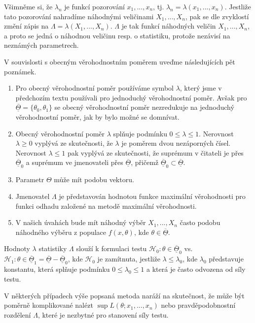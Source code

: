 Všimněme si, že $\lambda_n$ je funkcí pozorování $x_1, ..., x_n$, tj. $\lambda_n = \lambda(x_1, ..., x_n)$. Jestliže tato pozorování nahradíme náhodnými veličinami $X_1, ..., X_n$, pak se dle zvyklostí změní zápis na $\Lambda = \lambda(X_1, ..., X_n)$. $\Lambda$ je tak funkcí náhodných veličin $X_1, ..., X_n$, a proto se jedná o náhodnou veličinu resp. o statistiku, protože nezávisí na neznámých parametrech.

V souvislosti s obecným věrohodnostním poměrem uveďme následujících pět poznámek.
\begin{enumerate}
\item Pro obecný věrohodnostní poměr používáme symbol $\lambda$, který jsme v předchozím textu používali pro jednoduchý věrohodnostní poměr. Avšak pro $\overline{\underline{\Theta}} = \{\theta_0, \theta_1\}$ se obecný věrohodnostní poměr nezredukuje na jednoduchý věrohodnostní poměr, jak by bylo možné se domnívat.
\item Obecný věrohodnostní poměr $\lambda$ splňuje podmínku $0 \le \lambda \le 1$. Nerovnost $\lambda \ge 0$ vyplývá ze skutečnosti, že $\lambda$ je poměrem dvou nezáporných čísel. Nerovnost $\lambda \le 1$ pak vyplývá ze skutečnosti, že suprémum v čitateli je přes $\overline{\underline{\Theta}}_0$ a suprémum ve jmenovateli přes $\overline{\underline{\Theta}}$, přičemž $\overline{\underline{\Theta}}_0 \subset \overline{\underline{\Theta}}$.
\item Parametr $\Theta$ může mít podobu vektoru.
\item Jmenovatel $\Lambda$ je představován hodnotou funkce maximální věrohodnosti pro funkci odhadu založené na metodě maximální věrohodnosti. 
\item V našich úvahách bude mít náhodný výběr $X_1, ..., X_n$ často podobu náhodného výběru z populace $f(x, \theta)$, kde $\theta \in \overline{\underline{\Theta}}$.
\end{enumerate}

Hodnoty $\lambda$ statistiky $\Lambda$ slouží k formulaci testu $\mathscr{H}_0: \theta \in \overline{\underline{\Theta}}_0$ vs. $\mathscr{H}_1: \theta \in \overline{\underline{\Theta}}_1 = \overline{\underline{\Theta}} - \overline{\underline{\Theta}}_0$, kde $\mathscr{H}_0$ je zamítnuta, jestliže $\lambda \le \lambda_0$, kde $\lambda_0$ představuje konstantu, která splňuje podmínku $0 \le \lambda_0 \le 1$ a která je často odvozena od síly testu.

V některých případech výše popsaná metoda naráží na skutečnost, že může být poměrně komplikované nalézt $\sup L(\theta; x_1, ..., x_n)$ nebo pravděpodobnostní rozdělení $\Lambda$, které je nezbytné pro stanovení síly testu.

